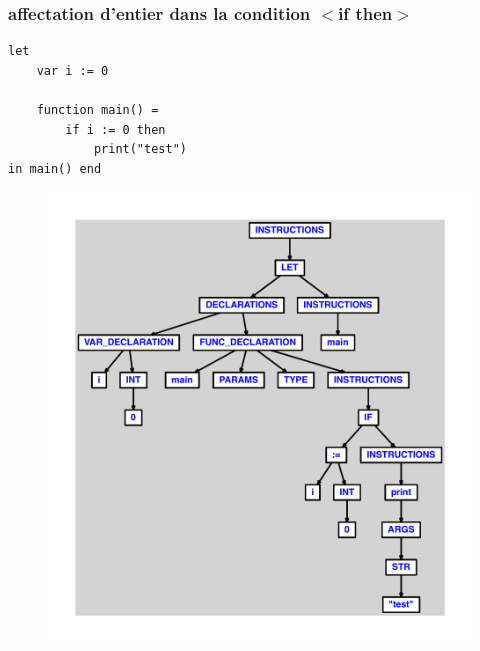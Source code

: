 \documentclass{article}
\begin{document}
\subsubsection{affectation d'entier dans la condition $ < $if then$ > $}
\begin{lstlisting}
let
	var i := 0

	function main() =
		if i := 0 then
			print("test")
in main() end
\end{lstlisting}
\newpage
\begin{figure}[H]
\centering
\includegraphics[max width=\textwidth]{ast/ast_249.pdf}
\end{figure}
\newpage
\end{document}
